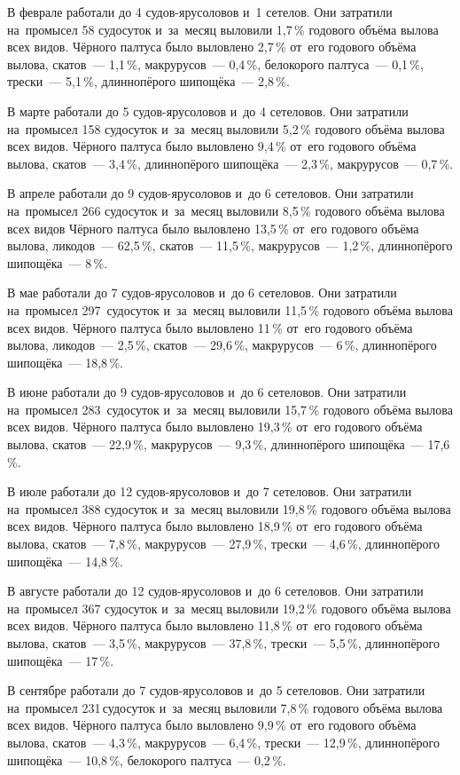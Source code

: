 В феврале работали до 4 судов-ярусоловов и~1 сетелов. Они затратили на~промысел 58 судосуток и~за~месяц выловили 1,7\,\% годового объёма вылова всех видов. Чёрного палтуса было выловлено 2,7\,\% от~его годового объёма вылова, скатов~--- 1,1\,\%, макрурусов~--- 0,4\,\%, белокорого палтуса~--- 0,1\,\%, трески~--- 5,1\,\%, длиннопёрого шипощёка~--- 2,8\,\%.

В марте работали до 5 судов-ярусоловов и~до 4 сетеловов. Они затратили на~промысел 158 судосуток и~за~месяц выловили 5,2\,\% годового объёма вылова всех видов. Чёрного палтуса было выловлено 9,4\,\% от~его годового объёма вылова, скатов~--- 3,4\,\%, длиннопёрого шипощёка~--- 2,3\,\%, макрурусов~--- 0,7\,\%.

В апреле работали до 9 судов-ярусоловов и~до 6 сетеловов. Они затратили на~промысел 266 судосуток и~за~месяц выловили 8,5\,\% годового объёма вылова всех видов Чёрного палтуса было выловлено 13,5\,\% от~его годового объёма вылова, ликодов~--- 62,5\,\%, скатов~--- 11,5\,\%, макрурусов~--- 1,2\,\%, длиннопёрого шипощёка~--- 8\,\%.

В мае работали до 7 судов-ярусоловов и~до 6 сетеловов. Они затратили на~промысел 297~судосуток и~за~месяц выловили 11,5\,\% годового объёма вылова всех видов. Чёрного палтуса было выловлено 11\,\% от~его годового объёма вылова, ликодов~--- 2,5\,\%, скатов~--- 29,6\,\%, макрурусов~--- 6\,\%, длиннопёрого шипощёка~--- 18,8\,\%.

В июне работали до 9 судов-ярусоловов и~до 6 сетеловов. Они затратили на~промысел 283~судосуток и~за~месяц выловили 15,7\,\% годового объёма вылова всех видов. Чёрного палтуса было выловлено 19,3\,\% от~его годового объёма вылова, скатов~--- 22,9\,\%, макрурусов~--- 9,3\,\%, длиннопёрого шипощёка~--- 17,6\,\%.

В июле работали до 12 судов-ярусоловов и~до 7 сетеловов. Они затратили на~промысел 388 судосуток и~за~месяц выловили 19,8\,\% годового объёма вылова всех видов. Чёрного палтуса было выловлено 18,9\,\% от~его годового объёма вылова, скатов~--- 7,8\,\%, макрурусов~--- 27,9\,\%, трески~--- 4,6\,\%, длиннопёрого шипощёка~--- 14,8\,\%.

В августе работали до 12 судов-ярусоловов и~до 6 сетеловов. Они затратили на~промысел 367 судосуток и~за~месяц выловили 19,2\,\% годового объёма вылова всех видов. Чёрного палтуса было выловлено 11,8\,\% от~его годового объёма вылова, скатов~--- 3,5\,\%, макрурусов~--- 37,8\,\%, трески~--- 5,5\,\%, длиннопёрого шипощёка~--- 17\,\%.

В сентябре работали до 7 судов-ярусоловов и~до 5 сетеловов. Они затратили на~промысел 231\,судосуток и~за~месяц выловили 7,8\,\% годового объёма вылова всех видов. Чёрного палтуса было выловлено 9,9\,\% от~его годового объёма вылова, скатов~--- 4,3\,\%, макрурусов~--- 6,4\,\%, трески~--- 12,9\,\%, длиннопёрого шипощёка~--- 10,8\,\%, белокорого палтуса~--- 0,2\,\%.

